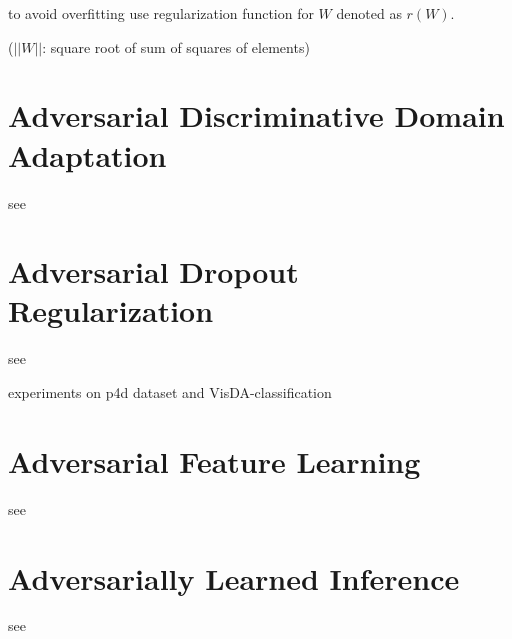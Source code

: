 to avoid overfitting use regularization function for $W$ denoted as $r(W)$. 


($||W||$: square root of sum of squares of elements)


\section{Adversarial Discriminative Domain Adaptation}

see \cite{DBLP:journals/corr/TzengHSD17}


\section{Adversarial Dropout Regularization}

see \cite{DBLP:journals/corr/abs-1711-01575}

experiments on p4d dataset and VisDA-classification\\

\section{Adversarial Feature Learning}

see \cite{DBLP:journals/corr/DonahueKD16}


\section{Adversarially Learned Inference}

see \cite{dumoulin2016adversarially}
